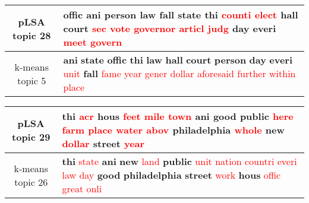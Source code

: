 \begin{center}\begin{tabularx}{\textwidth} {
  | c | >{\raggedright\arraybackslash}X | } \hline 
pLSA topic 28 & \textbf{offic} \textbf{ani} \textbf{person} \textbf{law} \textbf{fall} \textbf{state} \textbf{thi} \textcolor{red}{counti} \textcolor{red}{elect} \textbf{hall} \textbf{court} \textcolor{red}{sec} \textcolor{red}{vote} \textcolor{red}{governor} \textcolor{red}{articl} \textcolor{red}{judg} \textbf{day} \textbf{everi} \textcolor{red}{meet} \textcolor{red}{govern} \\ \hline 
k-means topic 5 & \textbf{ani} \textbf{state} \textbf{offic} \textbf{thi} \textbf{law} \textbf{hall} \textbf{court} \textbf{person} \textbf{day} \textbf{everi} \textcolor{red}{unit} \textbf{fall} \textcolor{red}{fame} \textcolor{red}{year} \textcolor{red}{gener} \textcolor{red}{dollar} \textcolor{red}{aforesaid} \textcolor{red}{further} \textcolor{red}{within} \textcolor{red}{place} \\ \hline 
\end{tabularx}

\end{center}

\begin{center}\begin{tabularx}{\textwidth} {
  | c | >{\raggedright\arraybackslash}X | } \hline 
pLSA topic 29 & \textbf{thi} \textcolor{red}{acr} \textbf{hous} \textcolor{red}{feet} \textcolor{red}{mile} \textcolor{red}{town} \textbf{ani} \textbf{good} \textbf{public} \textcolor{red}{here} \textcolor{red}{farm} \textcolor{red}{place} \textcolor{red}{water} \textcolor{red}{abov} \textbf{philadelphia} \textcolor{red}{whole} \textbf{new} \textcolor{red}{dollar} \textbf{street} \textcolor{red}{year} \\ \hline 
k-means topic 26 & \textbf{thi} \textcolor{red}{state} \textbf{ani} \textbf{new} \textcolor{red}{land} \textbf{public} \textcolor{red}{unit} \textcolor{red}{nation} \textcolor{red}{countri} \textcolor{red}{everi} \textcolor{red}{law} \textcolor{red}{day} \textbf{good} \textbf{philadelphia} \textbf{street} \textcolor{red}{work} \textbf{hous} \textcolor{red}{offic} \textcolor{red}{great} \textcolor{red}{onli} \\ \hline 
\end{tabularx}

\end{center}


